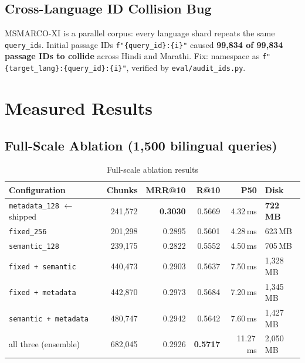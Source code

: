 \documentclass[12pt,a4paper]{article}
\begin{document}
\subsection{Cross-Language ID Collision Bug}

MSMARCO-XI is a parallel corpus: every language shard repeats the same \texttt{query\_id}s. Initial passage IDs \texttt{f"\{query\_id\}:\{i\}"} caused \textbf{99,834 of 99,834 passage IDs to collide} across Hindi and Marathi. Fix: namespace as \texttt{f"\{target\_lang\}:\{query\_id\}:\{i\}"}, verified by \texttt{eval/audit\_ids.py}.


\section{Measured Results}

\subsection{Full-Scale Ablation (1,500 bilingual queries)}

\begin{table}[H]
\centering
\small
\begin{tabular}{lrrrrl}
\toprule
\textbf{Configuration} & \textbf{Chunks} & \textbf{MRR@10} & \textbf{R@10} & \textbf{P50} & \textbf{Disk} \\
\midrule
\texttt{metadata\_128} $\leftarrow$ shipped & 241,572 & \textbf{0.3030} & 0.5669 & 4.32\,ms & \textbf{722\,MB} \\
\texttt{fixed\_256}                         & 201,298 & 0.2895 & 0.5601 & 4.28\,ms & 623\,MB \\
\texttt{semantic\_128}                      & 239,175 & 0.2822 & 0.5552 & 4.50\,ms & 705\,MB \\
\texttt{fixed + semantic}                   & 440,473 & 0.2903 & 0.5637 & 7.50\,ms & 1,328\,MB \\
\texttt{fixed + metadata}                   & 442,870 & 0.2973 & 0.5684 & 7.20\,ms & 1,345\,MB \\
\texttt{semantic + metadata}                & 480,747 & 0.2942 & 0.5642 & 7.60\,ms & 1,427\,MB \\
all three (ensemble)                        & 682,045 & 0.2926 & \textbf{0.5717} & 11.27\,ms & 2,050\,MB \\
\bottomrule
\end{tabular}
\caption{Full-scale ablation results}
\end{table}
\end{document}
